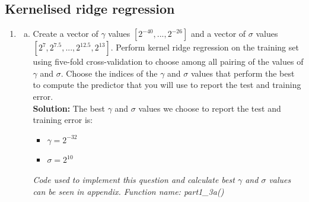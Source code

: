 \documentclass[A4,12pt]{article}
\begin{document}
\subsection{Kernelised ridge regression}
\begin{enumerate}[5.]
\item
  \begin{enumerate}[a.]
    \item Create a vector of $\gamma$ values $[2^{-40}, . . . , 2^{-26}]$ and a vector of $\sigma$ values $[2^{7}, 2^{7.5}, . . . , 2^{12.5}, 2^{13}]$. Perform kernel ridge regression on the training set using five-fold cross-validation to choose among all pairing of the values of $\gamma$ and $\sigma$. Choose the indices of the $\gamma$ and $\sigma$ values that perform the best to compute the predictor that you will use to report the test and training error.\\
    \textbf{Solution:} The best $\gamma$ and $\sigma$ values we choose to report the test and training error is:
    \begin{itemize}
      \item $\gamma = 2^{-32} $
      \item $\sigma = 2^{10}$
    \end{itemize}
    \textit{Code used to implement this question and calculate best $\gamma$ and $\sigma$ values can be seen in appendix. Function name: part1\_3a()}
    

\end{enumerate}
\end{enumerate}
\end{document}

